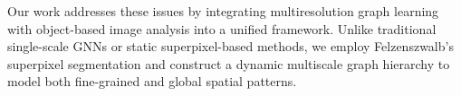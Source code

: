 Our work addresses these issues by integrating multiresolution graph learning with object-based image analysis into a unified framework. Unlike traditional single-scale GNNs or static superpixel-based methods, we employ Felzenszwalb’s superpixel segmentation and construct a dynamic multiscale graph hierarchy to model both fine-grained and global spatial patterns.
